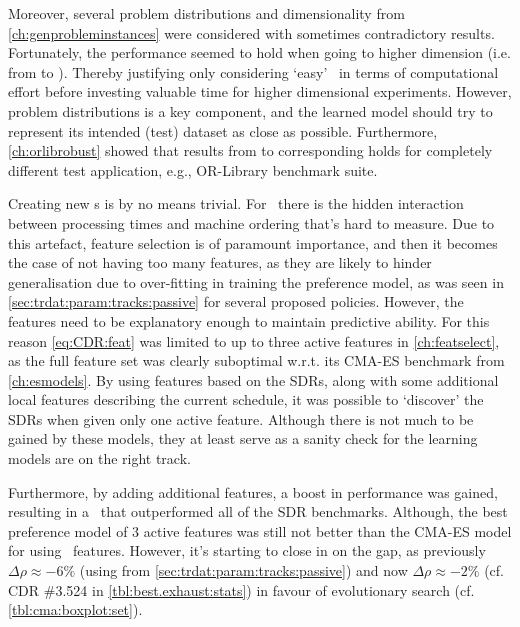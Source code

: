 Moreover, several problem distributions and dimensionality from 
\cref{ch:genprobleminstances} were considered with sometimes contradictory 
results. Fortunately, the performance seemed to hold when going to higher 
dimension (i.e. from \Problem[6\times5]{} to \Problem[10\times10]{}). 
Thereby justifying only considering `easy' \JSP\ in terms of computational 
effort before investing valuable time for higher dimensional experiments. 
However, problem distributions is a key component, and the learned model should 
try to represent its intended (test) dataset as close as possible.
Furthermore, \cref{ch:orlibrobust} showed that results from \Problem{\train} to 
corresponding \Problem{\test} holds for completely different test application, 
e.g., OR-Library benchmark suite.

Creating new \dr s is by no means trivial. For \jsp\ there is 
the hidden interaction between processing times and machine ordering that's 
hard to measure.
Due to this artefact, feature selection is of paramount importance, and then it 
becomes the case of not having too many features, as they are likely to hinder 
generalisation due to over-fitting in training the preference model, as was 
seen in \cref{sec:trdat:param:tracks:passive} for several proposed policies. 
However, the features need to be explanatory enough to maintain predictive 
ability. 
For this reason \cref{eq:CDR:feat} was limited to up to three active features 
in \cref{ch:featselect}, as the full feature set was clearly suboptimal 
w.r.t. its CMA-ES benchmark from \cref{ch:esmodels}. 
By using features based on the SDRs, along with some additional local features 
describing the current schedule, it was possible to `discover' the SDRs when 
given only one active feature. 
Although there is not much to be gained by these models, they at least serve as 
a sanity check for the learning models are on the right track. 

Furthermore, by adding additional features, a boost in performance was 
gained, resulting in a \cdr\ that outperformed all of the SDR benchmarks. 
Although, the best preference model of 3 active features was still not better 
than the CMA-ES model for  using \NrFeatLocal\ features. 
However, it's starting to close in on the gap, as previously 
$\Delta\rho\approx-6\%$ (using  from 
\cref{sec:trdat:param:tracks:passive}) and now $\Delta\rho\approx-2\%$ (cf. 
CDR \#3.524 in \cref{tbl:best.exhaust:stats}) in favour of evolutionary 
search (cf. \cref{tbl:cma:boxplot:set}).

